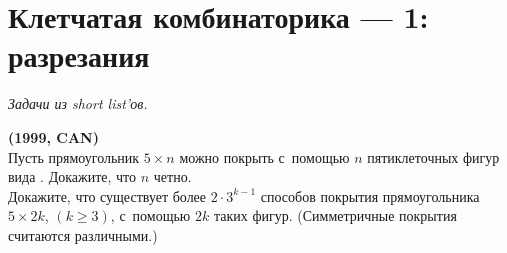 
\section*{Клетчатая комбинаторика --- 1: разрезания}


\begingroup
\providecommand\ifincludesolutions{\iffalse}


\emph{Задачи из short list'ов.}

\ifincludesolutions
\textbf{Версия с решениями.}
\emph{Решения являются слабообработанным переводом с~английского.
Beware!}
\fi

\begin{problems}

\item\textbf{(1999, CAN)}
\\
\sp
Пусть прямоугольник $5 \times n$ можно покрыть с~помощью $n$ пятиклеточных
фигур вида .
Докажите, что $n$ четно.
\\
\sp
Докажите, что существует более $2 \cdot 3^{k-1}$ способов покрытия
прямоугольника $5 \times 2 k$, $(k \geq 3)$, с~помощью $2k$ таких фигур.
(Симметричные покрытия считаются различными.)

\end{problems}

\ifincludesolutions
\setcounter{jeolmsubproblem}{0}%
\sp
Покрасим первый, третий и~пятый ряды в~красный, а~остальные квадратики в~белый.
Всего $n$ фигур и~$3n$ красных квадратов.
Поскольку каждая фигура покрывает не~более трех красных квадратов, она должна
покрывать ровно 3 красных квадратика.
Отсюда следует, что два белых квадратика, покрытых фигурой, лежат в~одном ряду,
иначе их~будет не~менее трех.
Следовательно, каждый белый ряд разбивается на~пары квадратов, принадлежащих
одному кусочку.
Отсюда следует, что количество клеток в~ряду, равное $n$, четно.
\par
\sp
За~$a_k$ обозначим количество различных покрытий прямоугольника $5 \times 2k$.
За~$b_k$ обозначим количество покрытий, не~разбивающихся на~меньшие разбиения
вертикальной линией (без пересечения кусочков).
Легко видеть, что $a_1 = b_1 = 2$, $b_2 = 2$, $a_2 = 6 = 2 \cdot 3$, $b_3 = 4$,
и~далее, по~индукции, $b_{3k} \geq 4$, $b_{3k+1} \geq 2$ и~$b_{3k+2} \geq 2$.
Также $a_k = b_k + \sum_{i=1}^{k-1} b_i a_{k-i}$.
При $k \geq 3$ по~индукции
\[
    a_k
>
    2 + \sum_{i=1}^{k-1} 2 a_{k-i}
\geq
    2\cdot3^{k-1}+2a_{k-1}
\geq
    2\cdot 3^k
\,.\]
\fi %

